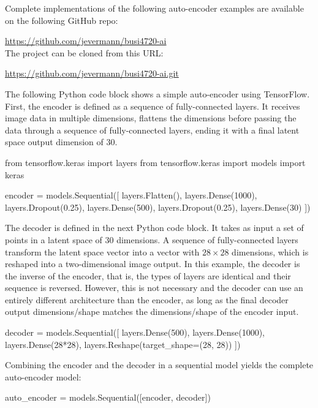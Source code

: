 \begin{resourcebox}
Complete implementations of the following auto-encoder examples are available on the following GitHub repo:

\url{https://github.com/jevermann/busi4720-ai} \\

The project can be cloned from this URL:

\url{https://github.com/jevermann/busi4720-ai.git}
\end{resourcebox}

The following Python code block shows a simple auto-encoder using TensorFlow. First, the encoder is defined as a sequence of fully-connected layers. It receives image data in multiple dimensions, flattens the dimensions before passing the data through a sequence of fully-connected layers, ending it with a final latent space output dimension of $30$. 

\begin{pythoncode}
from tensorflow.keras import layers
from tensorflow.keras import models
import keras

encoder = models.Sequential([
    layers.Flatten(),
    layers.Dense(1000),
    layers.Dropout(0.25),
    layers.Dense(500),
    layers.Dropout(0.25),
    layers.Dense(30)
])
\end{pythoncode}

The decoder is defined in the next Python code block. It takes as input a set of points in a latent space of $30$ dimensions. A sequence of fully-connected layers transform the latent space vector into a vector with $28 \times 28$ dimensions, which is reshaped into a two-dimensional image output. In this example, the decoder is the inverse of the encoder, that is, the types of layers are identical and their sequence is reversed. However, this is not necessary and the decoder can use an entirely different architecture than the encoder, as long as the final decoder output dimensions/shape matches the dimensions/shape of the encoder input.

\begin{pythoncode}
decoder = models.Sequential([
    layers.Dense(500),
    layers.Dense(1000),
    layers.Dense(28*28),
    layers.Reshape(target_shape=(28, 28))
])
\end{pythoncode}

Combining the encoder and the decoder in a sequential model yields the complete auto-encoder model:

\begin{pythoncode}
auto_encoder = models.Sequential([encoder, decoder])
\end{pythoncode}


